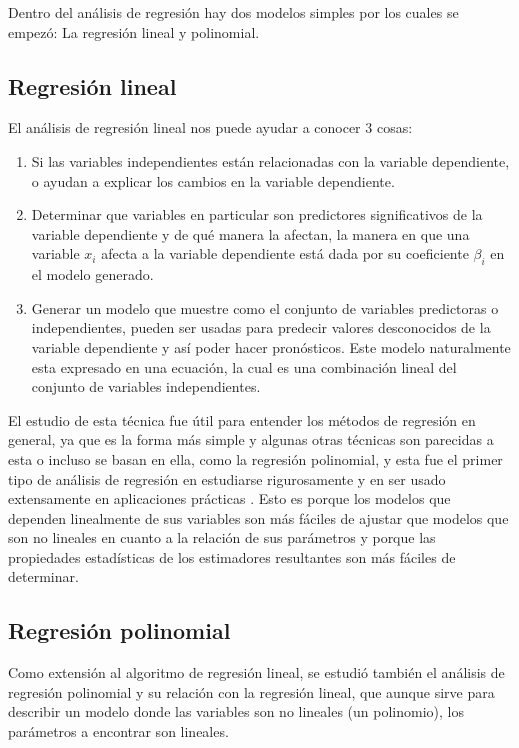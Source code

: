 Dentro del análisis de regresión hay dos modelos simples por los cuales se
empezó: La regresión lineal y polinomial.

\subsection{Regresión lineal}
El análisis de regresión lineal nos puede ayudar a conocer 3 cosas:

\begin{enumerate}
	\item Si las variables independientes están relacionadas con la variable dependiente, o ayudan a explicar los cambios en la variable dependiente.
	\item Determinar que variables en particular son predictores significativos de la variable dependiente y de qué manera la afectan, la manera en que una variable $x_i$ afecta a la variable dependiente está dada por su coeficiente $\beta_i$ en el modelo generado.
	\item Generar un modelo que muestre como el conjunto de variables predictoras o independientes, pueden ser usadas para predecir valores desconocidos de la variable dependiente y así poder hacer pronósticos. Este modelo naturalmente esta expresado en una ecuación, la cual es una combinación lineal del conjunto de variables independientes.
\end{enumerate}

El estudio de esta técnica fue útil para entender los métodos de regresión en general, ya que es la forma más simple y algunas otras técnicas son parecidas a esta o incluso se basan en ella, como la regresión polinomial, y esta fue el primer tipo de análisis de regresión en estudiarse rigurosamente y en ser usado extensamente en aplicaciones prácticas \cite{XYanLinearRegressionAnalysis}.
Esto es porque los modelos que dependen linealmente de sus variables son más fáciles de ajustar que modelos que son no lineales en cuanto a la relación de sus parámetros y porque las propiedades estadísticas de los estimadores resultantes son más fáciles de determinar.

\subsection{Regresión polinomial}\label{subsec:regresionPolinomial}
Como extensión al algoritmo de regresión lineal, se estudió también el análisis de regresión polinomial y su relación con la regresión lineal, que aunque sirve para describir un modelo donde las variables son no lineales (un polinomio), los parámetros a encontrar son lineales.

